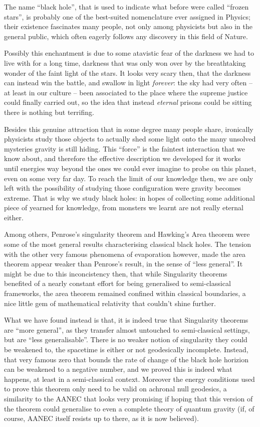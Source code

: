 The name ``black hole'', that is used to indicate what before were called ``frozen stars'', is probably one of the best-suited nomenclature ever assigned in Physics; their existence fascinates many people, not only among physicists but also in the general public, which often eagerly follows any discovery in this field of Nature.

Possibly this enchantment is due to some atavistic fear of the darkness we had to live with for a long time, darkness that was only won over by the breathtaking wonder of the faint light of the stars. It looks very scary then, that the darkness can instead win the battle, and swallow in light \emph{forever}: the sky had very often -- at least in our culture -- been associated to the place where the supreme justice could finally carried out, so the idea that instead \emph{eternal} prisons could be sitting there is nothing but terrifing.  
	
Besides this genuine attraction that in some degree many people share, ironically physicists study those objects to actually shed some light onto the many unsolved mysteries gravity is still hiding.
This ``force'' is the faintest interaction that we know about, and therefore the effective description we developed for it works until energies way beyond the ones we could ever imagine to probe on this planet, even on some very far day. To reach the limit of our knowledge then, we are only left with the possibility of studying those configuration were gravity becomes extreme. That is why we study black holes: in hopes of collecting some additional piece of yearned for knowledge, from monsters we learnt are not really eternal either. 

Among others, Penrose's singularity theorem and Hawking's Area theorem were some of the most general results characterising classical black holes. The tension with the other very famous phenomena of evaporation however, made the area theorem appear weaker than Penrose's result, in the sense of ``less general''. It might be due to this inconcistency then, that while Singularity theorems benefited of a nearly constant effort for being generalised to semi-classical frameworks, the area theorem remained confined within classical boundaries, a nice little gem of mathematical relativity that couldn't shine further.

What we have found instead is that, it is indeed true that Singularity theorems are ``more general'', as they transfer almost untouched to semi-classical settings, but are ``less generalisable''. There is no weaker notion of singularity they could be weakened to, the spacetime is either or not geodesically incomplete. Instead, that very famous zero that bounds the rate of change of the black hole horizion can be weakened to a negative number, and we proved this is indeed what happens, at least in a semi-classical context. 
Moreover the energy conditions used to prove this theorem only need to be valid on achronal null geodesics, a similarity to the AANEC that looks very promising if hoping that this version of the theorem could generalise to even a complete theory of quantum gravity (if, of course, AANEC itself resists up to there, as it is now believed).

